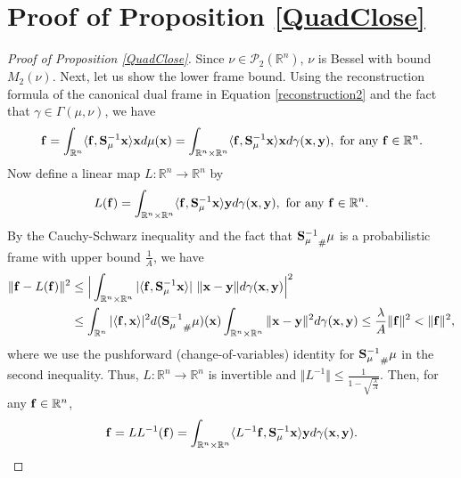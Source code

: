 \documentclass{amsart}
\numberwithin{equation}{section}
\theoremstyle{plain}
\theoremstyle{definition}
\begin{document}
\section{Proof of Proposition \ref{QuadClose} }\label{sec:proof}
\begin{proof}[Proof of Proposition \ref{QuadClose}]
Since  $\nu \in \mathcal{P}_2(\mathbb{R}^n)$, $\nu$ is Bessel with bound  $M_2(\nu)$. Next, let us show the lower frame bound. 
Using the reconstruction formula of the canonical dual frame in Equation \eqref{reconstruction2} and  the fact that $\gamma \in \Gamma(\mu, \nu)$, we have
\begin{equation*}
   {\bf f}=  \int_{\mathbb{R}^n} \langle {\bf f},  {\bf S}_\mu^{-1} {\bf x} \rangle {\bf x}   d\mu({\bf x}) = \int_{\mathbb{R}^n \times \mathbb{R}^n} \langle {\bf f},  {\bf S}_\mu^{-1} {\bf x} \rangle {\bf x}  d\gamma({\bf x},{\bf y}), \ \text{for any} \ {\bf f} \in \mathbb{R}^n.
\end{equation*}
Now define a linear map $L: \mathbb{R}^n \rightarrow \mathbb{R}^n$ by 
$$ L({\bf f}) = \int_{\mathbb{R}^n \times \mathbb{R}^n} \langle {\bf f},  {\bf S}_\mu^{-1} {\bf x} \rangle  {\bf y}  d\gamma({\bf x},{\bf y}), \ \text{for any ${\bf f} \in \mathbb{R}^n$}.
$$
By the Cauchy-Schwarz inequality and the fact that $ {{\bf S}_\mu^{-1}}_{\#} \mu$ is a probabilistic frame with upper bound $\frac{1}{A}$, we have
\begin{equation*}
\begin{split}
    \Vert {\bf f} -L({\bf f}) \Vert^2 
    &\leq \Big | \int_{\mathbb{R}^n \times \mathbb{R}^n} \vert \langle {\bf f}, {\bf S}_\mu^{-1} {\bf x} \rangle \vert  \ \Vert {\bf x}-{\bf y} \Vert d \gamma({\bf x}, {\bf y})  \Big |^2 \\
    &\leq \int_{\mathbb{R}^n} \vert \langle {\bf f}, {\bf x} \rangle \vert^2  d({{\bf S}_\mu^{-1}}_{\#}\mu) ({\bf x})  \int_{\mathbb{R}^n  \times \mathbb{R}^n} \Vert {\bf x} -{\bf y}\Vert^2 d \gamma({\bf x}, {\bf y})   \leq  \frac{\lambda}{A}  \Vert  {\bf f} \Vert ^2 < \Vert  {\bf f} \Vert ^2,  
\end{split}
\end{equation*}
where we use the pushforward (change-of-variables) identity for $ {{\bf S}_\mu^{-1}}_{\#} \mu$ in the second inequality.  Thus, $L: \mathbb{R}^n \rightarrow \mathbb{R}^n$ is invertible and $\Vert L^{-1} \Vert \leq \frac{1}{1-\sqrt{\frac{\lambda}{A}}}$.
Then, for any ${\bf f} \in \mathbb{R}^n$, 
\begin{equation*}
    {\bf f} = LL^{-1}({\bf f}) =  \int_{\mathbb{R}^n \times \mathbb{R}^n} \langle L^{-1}{\bf f},  {\bf S}_\mu^{-1} {\bf x} \rangle  {\bf y}  d\gamma({\bf x},{\bf y}).

\end{equation*}
\end{proof}
\end{document}

